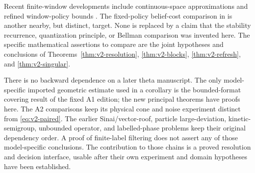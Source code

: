 Recent finite-window developments include continuous-space approximations
\cite{KBY2024} and refined window-policy bounds \cite{DKY2024}.
The fixed-policy belief-cost comparison in \cite{Kim2026} is another
nearby, but distinct, target. None is replaced by a claim that the
stability recurrence, quantization principle, or Bellman comparison was
invented here. The specific mathematical assertions to compare are the
joint hypotheses and conclusions of
Theorems~\ref{thm:v2-resolution}, \ref{thm:v2-blocks},
\ref{thm:v2-refresh}, and \ref{thm:v2-singular}.

There is no backward dependence on a later theta manuscript. The only
model-specific imported geometric estimate used in a corollary is the
bounded-format covering result of the fixed A1 edition; the new principal
theorems have proofs here. The A2 comparisons keep its physical cone and
noise experiment distinct from \eqref{eq:v2-paired}. The earlier
Sinai/vector-roof, particle large-deviation, kinetic-semigroup, unbounded
operator, and labelled-phase problems keep their original dependency
order. A proof of finite-label filtering does not assert any of those
model-specific conclusions. The contribution to those chains is a
proved resolution and decision interface, usable after their own
experiment and domain hypotheses have been established.

